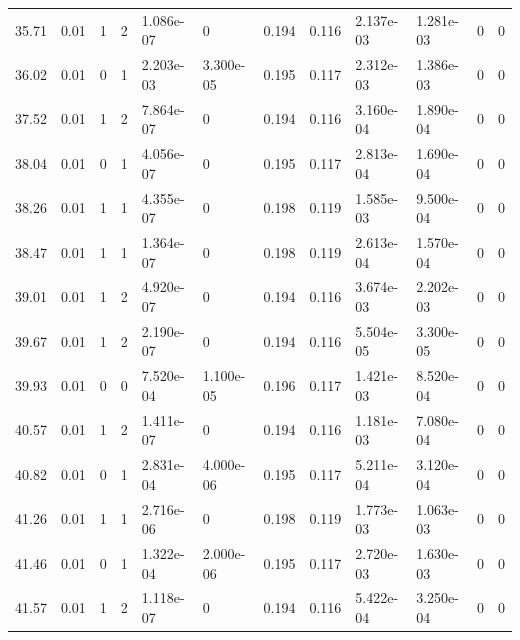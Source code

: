 \documentclass[preview]{standalone}
\begin{document}
{{{\begin{tabular}{L{1.2cm}C{1.2cm} C{0.3cm}C{0.5cm} C{1.4cm}C{1.4cm} C{1.4cm}C{1.4cm} C{1.6cm}C{1.6cm} C{1.6cm}C{1.6cm}}
  35.71  &  0.01  & 1     &  2 &  1.086e-07  & 0  &  0.194&   0.116& 2.137e-03 & 1.281e-03   &  0 & 0  \\ 
  36.02  &  0.01  & 0     &  1 &  2.203e-03  & 3.300e-05  &  0.195&   0.117& 2.312e-03 & 1.386e-03   &  0 & 0  \\ 
  37.52  &  0.01  & 1     &  2 &  7.864e-07  & 0  &  0.194&   0.116& 3.160e-04 & 1.890e-04   &  0 & 0  \\ 
  38.04  &  0.01  & 0     &  1 &  4.056e-07  & 0  &  0.195&   0.117& 2.813e-04 & 1.690e-04   &  0 & 0  \\ 
  38.26  &  0.01  & 1     &  1 &  4.355e-07  & 0  &  0.198&   0.119& 1.585e-03 & 9.500e-04   &  0 & 0  \\ 
  38.47  &  0.01  & 1     &  1 &  1.364e-07  & 0  &  0.198&   0.119& 2.613e-04 & 1.570e-04   &  0 & 0  \\ 
  39.01  &  0.01  & 1     &  2 &  4.920e-07  & 0  &  0.194&   0.116& 3.674e-03 & 2.202e-03   &  0 & 0  \\ 
  39.67  &  0.01  & 1     &  2 &  2.190e-07  & 0  &  0.194&   0.116& 5.504e-05 & 3.300e-05   &  0 & 0  \\ 
  39.93  &  0.01  & 0     &  0 &  7.520e-04  & 1.100e-05  &  0.196&   0.117& 1.421e-03 & 8.520e-04   &  0 & 0  \\ 
  40.57  &  0.01  & 1     &  2 &  1.411e-07  & 0  &  0.194&   0.116& 1.181e-03 & 7.080e-04   &  0 & 0  \\ 
  40.82  &  0.01  & 0     &  1 &  2.831e-04  & 4.000e-06  &  0.195&   0.117& 5.211e-04 & 3.120e-04   &  0 & 0  \\ 
  41.26  &  0.01  & 1     &  1 &  2.716e-06  & 0  &  0.198&   0.119& 1.773e-03 & 1.063e-03   &  0 & 0  \\ 
  41.46  &  0.01  & 0     &  1 &  1.322e-04  & 2.000e-06  &  0.195&   0.117& 2.720e-03 & 1.630e-03   &  0 & 0  \\ 
  41.57  &  0.01  & 1     &  2 &  1.118e-07  & 0  &  0.194&   0.116& 5.422e-04 & 3.250e-04   &  0 & 0  \\ 
\hline 
\end{tabular} 

}}}
\end{document}
